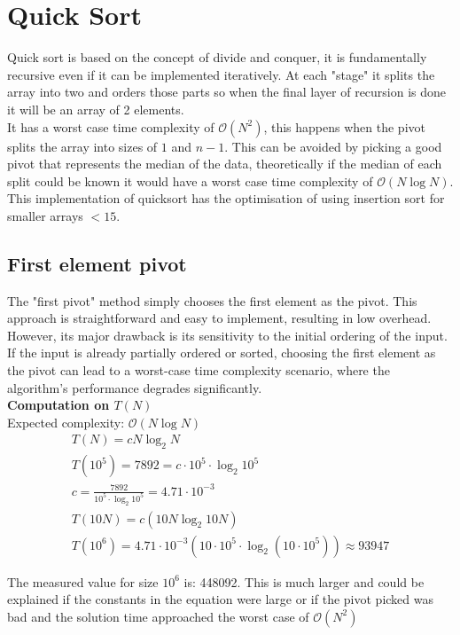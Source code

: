 \documentclass{article}
\begin{document}
\section{Quick Sort}
Quick sort is based on the concept of divide and conquer, it is fundamentally recursive even if it can be implemented iteratively. At each "stage" it splits the array into two and orders those parts so when the final layer of recursion is done it will be an array of 2 elements.\\
It has a worst case time complexity of $\mathcal{O}(N^2)$, this happens when the pivot splits the array into sizes of $1$ and $n - 1$. This can be avoided by picking a good pivot that represents the median of the data, theoretically if the median of each split could be known it would have a worst case time complexity of $\mathcal{O}(N\log N)$.\\
This implementation of quicksort has the optimisation of using insertion sort for smaller arrays $< 15$.

\subsection{First element pivot}

The "first pivot" method simply chooses the first element as the pivot. This approach is straightforward and easy to implement, resulting in low overhead. However, its major drawback is its sensitivity to the initial ordering of the input. If the input is already partially ordered or sorted, choosing the first element as the pivot can lead to a worst-case time complexity scenario, where the algorithm's performance degrades significantly. \\

\textbf{Computation on $T(N)$}\\
Expected complexity: $\mathcal{O}(N \log N)$\\

\[
\begin{gathered}
    T(N) = cN \log_2 N \\
    T(10^5) = 7892 = c \cdot 10^5 \cdot \log_2 10^5 \\
    c = \frac{7892}{10^5 \cdot \log_2 10^5} = 4.71 \cdot 10^{-3} \\
    T(10N) = c(10N \log_2 10N) \\
    T(10^6) = 4.71 \cdot 10^{-3}(10 \cdot 10^5 \cdot \log_2 (10 \cdot 10^5)) \approx 93947
\end{gathered}
\]

The measured value for size $10^6$ is: 448092. This is much larger and could be explained if the constants in the equation were large or if the pivot picked was bad and the solution time approached the worst case of $\mathcal{O}(N^2)$
\end{document}

